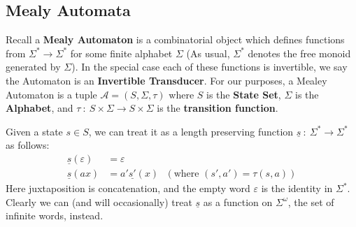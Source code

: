 \documentclass[runningheads]{llncs}
\newcommand{\A}{\mathcal{A}}
\newcommand{\2}{\textbf{2}}
\begin{document}
\begin{center}
\end{center}

\subsection{Mealy Automata}
Recall a \textbf{Mealy Automaton} is a combinatorial object which defines
functions from $\Sigma^* \to \Sigma^*$ for some finite alphabet $\Sigma$
(As usual, $\Sigma^*$ denotes the free monoid generated by $\Sigma$).
In the special case each of these functions is invertible, we say the
Automaton is an \textbf{Invertible Transducer}. For our purposes, 
a Mealey Automaton is a tuple $\A = (S, \Sigma, \tau)$
where $S$ is the \textbf{State Set}, $\Sigma$ is the \textbf{Alphabet},
and $\tau~:~S \times \Sigma \to S \times \Sigma$ is the
\textbf{transition function}. 

Given a state $s \in S$, we can treat it as a length preserving function 
$\underline{s}~:~\Sigma^* \to \Sigma^*$ as follows:
\begin{align*}
  \underline{s}(\varepsilon) &= \varepsilon\\
  \underline{s}(ax)       &= a' \underline{s'}(x) 
  ~~~(\text{where } (s', a') = \tau(s,a))
\end{align*}
Here juxtaposition is concatenation, and the empty word $\varepsilon$ is
the identity in $\Sigma^*$. Clearly we can (and will occasionally) treat 
$\underline{s}$ as a function on $\Sigma^\omega$, the set of infinite words, 
instead.
\end{document}

